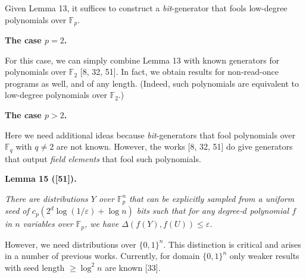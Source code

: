 \documentclass[10pt,a4paper]{article}
\begin{document}
Given Lemma 13, it suffices to construct a \emph{bit}-generator that fools low-degree polynomials over $\mathbb{F}_{p}$.\par





\par\medskip\noindent\textbf{The case $p=2$.}\par




For this case, we can simply combine Lemma 13
with known generators for polynomials over $\mathbb{F}_{2}$ [8, 32, 51]. In fact, we obtain results for non-read-once programs
as well, and of any length. (Indeed, such polynomials are equivalent
to low-degree polynomials over $\mathbb{F}_{2}$.)\par





\par\medskip\noindent\textbf{The case $p>2$.}\par




Here we need additional ideas because \emph{bit}-generators that fool polynomials over
$\mathbb{F}_{q}$ with $q\neq 2$ are not known. However, the works
[8, 32, 51] do give generators that output \emph{field elements} that fool such polynomials.\par





\par\medskip\noindent\textbf{
\textbf{Lemma 15}\textbf{ }([51])\textbf{.}
}\par



\emph{There are distributions $Y$ over $\mathbb{F}_{p}^{n}$
that can be explicitly sampled from a uniform seed of $c_{p}(2^{d}\log(1/\varepsilon)+\log n)$
bits such that for any degree-$d$ polynomial $f$ in $n$ variables over
$\mathbb{F}_{p}$, we have $\Delta(f(Y),f(U))\leq\varepsilon$.}\par






However, we need distributions over $\{0,1\}^{n}$. This distinction is critical
and arises in a number of previous works. Currently, for domain $\{0,1\}^{n}$
only weaker results with seed length $\geq\log^{2}n$ are known [33].\par
\end{document}
